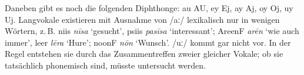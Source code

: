 \documentclass[12pt,paper=a4]{scrartcl}
\newcommand{\ayr}[1]{{\Tagati #1}}
\newcommand{\xayr}[3]{{\Tagati #1} \emph{#2} `#3'}
\begin{document}
Daneben gibt es noch die folgenden Diphthonge: au \ayr{AU}, ey \ayr{Ej}, ay \ayr{Aj}, oy \ayr{Oj}, uy \ayr{Uj}. Langvokale existieren mit Ausnahme von /aː/ lexikalisch nur in wenigen Wörtern, z.\,B. \xayr{niis}{nīsa}{gesucht}, \xayr{psiis}{pasīsa}{interessant}; \xayr{AreenF}{arēn}{wie auch immer}, \xayr{leer}{lēra}{Hure}; \xayr{noonF}{nōn}{Wunsch}. /uː/ kommt gar nicht vor. In der Regel entstehen sie durch das Zusammentreffen zweier gleicher Vokale; ob sie tatsächlich phonemisch sind, müsste untersucht werden.


\vfill


\end{document}
